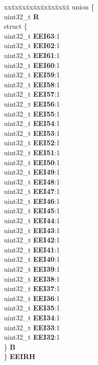 \begin{DoxyCompactItemize}
\begin{tabbing}
\end{tabbing}\item 
\mbox{\label{structEDMA__tag_acc5837ff530cde17e9063a77fe2a137e}} 
\begin{tabbing}
xx\=xx\=xx\=xx\=xx\=xx\=xx\=xx\=xx\=\kill
union \{\\
\>uint32\_t {\bfseries R}\\
\>struct \{\\
\>\>uint32\_t {\bfseries EEI63}:1\\
\>\>uint32\_t {\bfseries EEI62}:1\\
\>\>uint32\_t {\bfseries EEI61}:1\\
\>\>uint32\_t {\bfseries EEI60}:1\\
\>\>uint32\_t {\bfseries EEI59}:1\\
\>\>uint32\_t {\bfseries EEI58}:1\\
\>\>uint32\_t {\bfseries EEI57}:1\\
\>\>uint32\_t {\bfseries EEI56}:1\\
\>\>uint32\_t {\bfseries EEI55}:1\\
\>\>uint32\_t {\bfseries EEI54}:1\\
\>\>uint32\_t {\bfseries EEI53}:1\\
\>\>uint32\_t {\bfseries EEI52}:1\\
\>\>uint32\_t {\bfseries EEI51}:1\\
\>\>uint32\_t {\bfseries EEI50}:1\\
\>\>uint32\_t {\bfseries EEI49}:1\\
\>\>uint32\_t {\bfseries EEI48}:1\\
\>\>uint32\_t {\bfseries EEI47}:1\\
\>\>uint32\_t {\bfseries EEI46}:1\\
\>\>uint32\_t {\bfseries EEI45}:1\\
\>\>uint32\_t {\bfseries EEI44}:1\\
\>\>uint32\_t {\bfseries EEI43}:1\\
\>\>uint32\_t {\bfseries EEI42}:1\\
\>\>uint32\_t {\bfseries EEI41}:1\\
\>\>uint32\_t {\bfseries EEI40}:1\\
\>\>uint32\_t {\bfseries EEI39}:1\\
\>\>uint32\_t {\bfseries EEI38}:1\\
\>\>uint32\_t {\bfseries EEI37}:1\\
\>\>uint32\_t {\bfseries EEI36}:1\\
\>\>uint32\_t {\bfseries EEI35}:1\\
\>\>uint32\_t {\bfseries EEI34}:1\\
\>\>uint32\_t {\bfseries EEI33}:1\\
\>\>uint32\_t {\bfseries EEI32}:1\\
\>\} {\bfseries B}\\
\} {\bfseries EEIRH}\\


\end{tabbing}
\end{DoxyCompactItemize}
